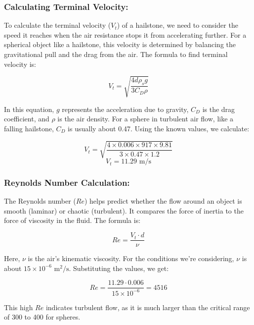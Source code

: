 \documentclass{article}
\numberwithin{equation}{section}
\begin{document}
\subsubsection*{Calculating Terminal Velocity:}
To calculate the terminal velocity (\(V_t\)) of a hailstone, we need to consider the speed it reaches when the air resistance stops it from accelerating further. For a spherical object like a hailstone, this velocity is determined by balancing the gravitational pull and the drag from the air. The formula to find terminal velocity is:

\begin{equation}
V_t = \sqrt{\frac{4 d \rho_s g}{3 C_D \rho}}
\end{equation}

In this equation, \(g\) represents the acceleration due to gravity, \(C_D\) is the drag coefficient, and \(\rho\) is the air density. For a sphere in turbulent air flow, like a falling hailstone, \(C_D\) is usually about 0.47. Using the known values, we calculate:

\begin{equation}
V_t = \sqrt{\frac{4 \times 0.006 \times 917 \times 9.81}{3 \times 0.47 \times 1.2}}
\end{equation}
\begin{equation}
V_t = 11.29 \text{ m/s}
\end{equation}

\subsubsection*{Reynolds Number Calculation:}
The Reynolds number (\(Re\)) helps predict whether the flow around an object is smooth (laminar) or chaotic (turbulent). It compares the force of inertia to the force of viscosity in the fluid. The formula is:

\begin{equation}
Re = \frac{V_t \cdot d}{\nu}
\end{equation}

Here, \(\nu\) is the air's kinematic viscosity. For the conditions we're considering, \(\nu\) is about \(15 \times 10^{-6} \text{ m}^2/\text{s}\). Substituting the values, we get:

\begin{equation}
Re = \frac{11.29 \cdot 0.006}{15 \times 10^{-6}} = 4516
\end{equation}

This high \(Re\) indicates turbulent flow, as it is much larger than the critical range of 300 to 400 for spheres.
\end{document}
